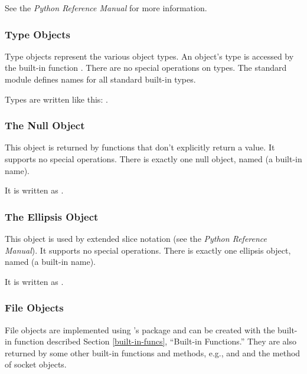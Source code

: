 See the \emph{Python Reference Manual} for more information.


\subsubsection{Type Objects \label{bltin-type-objects}}

Type objects represent the various object types.  An object's type is
accessed by the built-in function .  There are no special
operations on types.  The standard module  defines names
for all standard built-in types.

Types are written like this: .


\subsubsection{The Null Object \label{bltin-null-object}}

This object is returned by functions that don't explicitly return a
value.  It supports no special operations.  There is exactly one null
object, named  (a built-in name).

It is written as .


\subsubsection{The Ellipsis Object \label{bltin-ellipsis-object}}

This object is used by extended slice notation (see the \emph{Python
Reference Manual}).  It supports no special operations.  There is
exactly one ellipsis object, named  (a built-in name).

It is written as .

\subsubsection{File Objects
               \label{bltin-file-objects}}

File objects are implemented using \C{}'s 
package and can be created with the built-in function
 described Section
\ref{built-in-funcs}, ``Built-in Functions.''  They are also returned
by some other built-in functions and methods, e.g.,
 and  and the
 method of socket objects.


